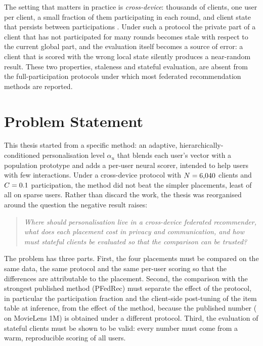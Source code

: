 The setting that matters in practice is \emph{cross-device}: thousands of clients, one user per
client, a small fraction of them participating in each round, and client state that persists
between participations \cite{kairouz2021advances,hard2018gboard}. Under such a protocol the
private part of a client that has not participated for many rounds becomes stale with respect
to the current global part, and the evaluation itself becomes a source of error: a client that
is scored with the wrong local state silently produces a near-random result. These two
properties, staleness and stateful evaluation, are absent from the full-participation protocols
under which most federated recommendation methods are reported.

\section{Problem Statement}
\label{sec:intro-problem}

This thesis started from a specific method: an adaptive, hierarchically-conditioned
personalisation level $\alpha_u$ that blends each user's vector with a population prototype and
adds a per-user neural scorer, intended to help users with few interactions. Under a cross-device
protocol with $N=6{,}040$ clients and $C=0.1$ participation, the method did not
beat the simpler placements, least of all on sparse users. Rather than discard the work, the
thesis was reorganised around the question the negative result raises:

\begin{quote}
\emph{Where should personalisation live in a cross-device federated recommender, what does each
placement cost in privacy and communication, and how must stateful clients be evaluated so that
the comparison can be trusted?}
\end{quote}

The problem has three parts. First, the four placements must be compared on the same data, the
same protocol and the same per-user scoring so that the differences are attributable to the
placement. Second, the comparison with the strongest published method (PFedRec) must separate the
effect of the protocol, in particular the participation fraction and the client-side post-tuning
of the item table at inference, from the effect of the method, because the published number
(\PublishedPfedrecNdcg{} \ndcg{} on MovieLens 1M) is obtained under a different protocol. Third,
the evaluation of stateful clients must be shown to be valid: every number must come from a
warm, reproducible scoring of all \DsUsers{} users.

